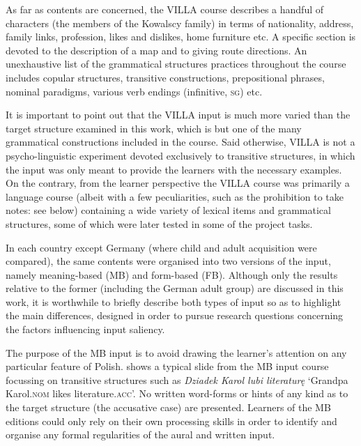 As far as contents are concerned, the VILLA course describes a handful of characters (the members of the Kowalscy family) in terms of nationality, address, family links, profession, likes and dislikes, home furniture etc. A specific section is devoted to the description of a map and to giving route directions. An unexhaustive list of the grammatical structures practices throughout the course includes copular structures, transitive constructions, prepositional phrases, nominal paradigms, various verb endings (infinitive, \textsc{sg}) etc.

It is important to point out that the VILLA input is much more varied than the target structure examined in this work, which is but one of the many grammatical constructions included in the course. Said otherwise, VILLA is not a psycho-linguistic experiment devoted exclusively to transitive structures, in which the input was only meant to provide the learners with the necessary examples. On the contrary, from the learner perspective the VILLA course was primarily a language course (albeit with a few peculiarities, such as the prohibition to take notes: see below) containing a wide variety of lexical items and grammatical structures, some of which were later tested in some of the project tasks.

In each country except Germany (where child and adult acquisition were compared), the same contents were organised into two versions of the input, namely meaning-based (MB) and form-based (FB). Although only the results relative to the former (including the German adult group) are discussed in this work, it is worthwhile to briefly describe both types of input so as to highlight the main differences, designed in order to pursue research questions concerning the factors influencing input saliency. 

The purpose of the MB input is to avoid drawing the learner’s attention on any particular feature of Polish.  shows a typical slide from the MB input course focussing on transitive structures such as \textit{Dziadek Karol lubi literaturę} ‘Grandpa Karol.\textsc{nom} likes literature.\textsc{acc}’. No written word-forms or hints of any kind as to the target structure (the accusative case) are presented. Learners of the MB editions could only rely on their own processing skills in order to identify and organise any formal regularities of the aural and written input.

